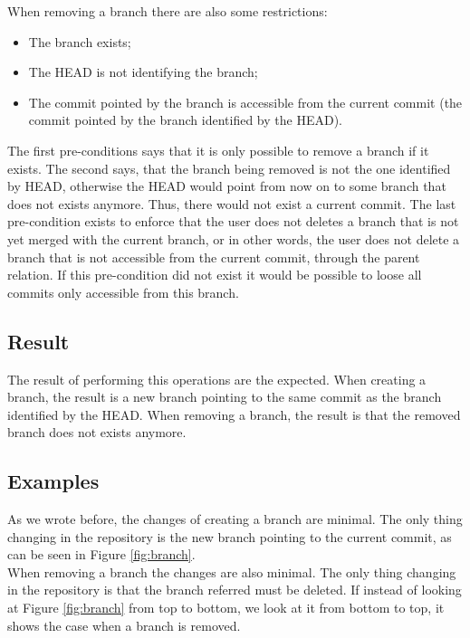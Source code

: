 When removing a branch there are also some restrictions:
\begin{itemize}
   \item The branch exists;
   \item The HEAD is not identifying the branch;
   \item The commit pointed by the branch is accessible from the
   current commit (the commit pointed by the branch identified by the
   HEAD).
\end{itemize}

The first pre-conditions says that it is only possible to remove a
branch if it exists. The second says, that the branch being removed is
not the one identified by HEAD, otherwise the HEAD would point from
now on to some branch that does not exists anymore. Thus, there would
not exist a current commit. The last pre-condition exists to enforce that
the user does not deletes a branch that is not yet merged with the
current branch, or in other words, the user does not delete a branch
that is not accessible from the current commit, through the parent relation. 
If this pre-condition did not exist it would be possible to loose all 
commits only accessible from this branch.


\subsection{Result}
The result of performing this operations are the expected. When creating a
branch, the result is a new branch pointing to the same commit as
the branch identified by the HEAD. When removing a branch, the result
is that the removed branch does not exists anymore.

\subsection{Examples}
As we wrote before, the changes of creating a branch are minimal. The only thing
changing in the repository is the new branch pointing to the current commit, as
can be seen in Figure \ref{fig:branch}. \\

When removing a branch the changes are also minimal. The only thing
changing in the repository is that the 
branch referred must be deleted. If instead of looking at Figure
\ref{fig:branch} from top to bottom, we look at it from bottom to top,
it shows the case when a branch is removed. \\ 

